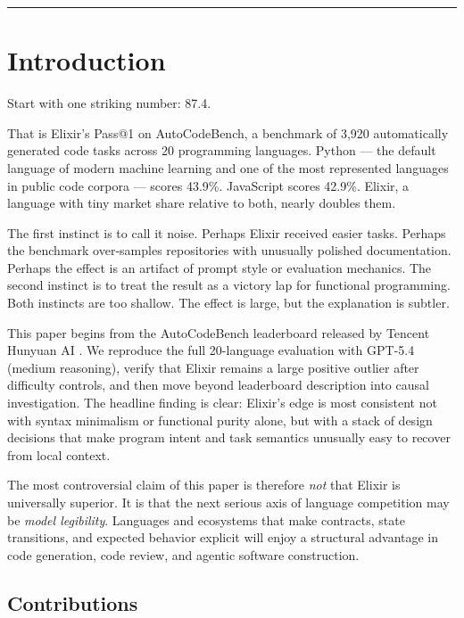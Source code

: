 \documentclass[11pt]{article}
\makeatletter
\newcommand{\acb}{AutoCodeBench}
\newcommand{\passatone}{Pass@1}
\newcommand{\elixir}{Elixir}
\newcommand{\pythonlang}{Python}
\makeatother
\begin{document}
\vspace{0.3em}
\noindent\rule{\textwidth}{0.4pt}
\vspace{0.6em}

\section{Introduction}

Start with one striking number: 87.4.

That is \elixir{}'s \passatone{} on \acb{}, a benchmark of 3,920 automatically generated code tasks across 20 programming languages. \pythonlang{} --- the default language of modern machine learning and one of the most represented languages in public code corpora --- scores 43.9\%. JavaScript scores 42.9\%. \elixir{}, a language with tiny market share relative to both, nearly doubles them.

The first instinct is to call it noise. Perhaps \elixir{} received easier tasks. Perhaps the benchmark over-samples repositories with unusually polished documentation. Perhaps the effect is an artifact of prompt style or evaluation mechanics. The second instinct is to treat the result as a victory lap for functional programming. Both instincts are too shallow. The effect is large, but the explanation is subtler.

This paper begins from the \acb{} leaderboard released by Tencent Hunyuan AI \cite{acb}. We reproduce the full 20-language evaluation with GPT-5.4 (medium reasoning), verify that \elixir{} remains a large positive outlier after difficulty controls, and then move beyond leaderboard description into causal investigation. The headline finding is clear: \elixir{}'s edge is most consistent not with syntax minimalism or functional purity alone, but with a stack of design decisions that make program intent and task semantics unusually easy to recover from local context.

The most controversial claim of this paper is therefore \emph{not} that \elixir{} is universally superior. It is that the next serious axis of language competition may be \emph{model legibility}. Languages and ecosystems that make contracts, state transitions, and expected behavior explicit will enjoy a structural advantage in code generation, code review, and agentic software construction.

\subsection*{Contributions}
\end{document}
